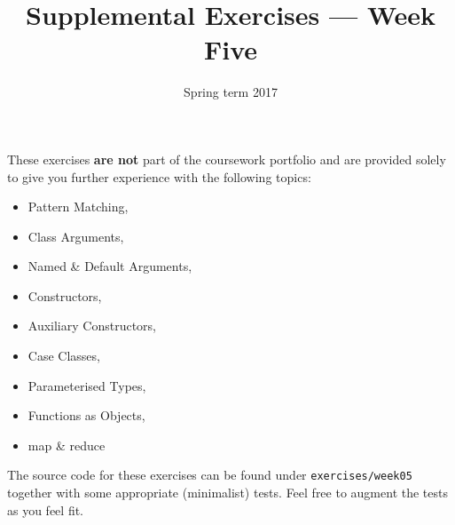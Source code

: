 \documentclass[a4paper,12pt]{exam}
\title{Supplemental Exercises --- Week Five}
\date{Spring term 2017}
\author{}
\begin{document}
\maketitle

These exercises \textbf{are not} part of the coursework portfolio and are provided 
solely to give you further experience with the following topics:
\begin{itemize}
\item Pattern Matching, 
\item Class Arguments, 
\item Named \& Default Arguments,
\item Constructors, 
\item Auxiliary Constructors, 
\item Case Classes,
\item Parameterised Types, 
\item Functions as Objects, 
\item map \& reduce	
\end{itemize}
The source code for these exercises can be found under \verb!exercises/week05! together 
with some appropriate (minimalist) tests. Feel free to augment the tests as you feel fit.
\end{document}
